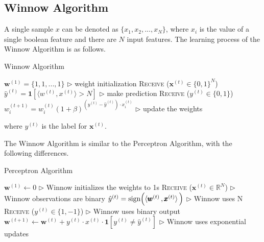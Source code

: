 \documentclass[11pt]{article}
\begin{document}
\subsection{Winnow Algorithm}
A single sample \textbf{$x$} can be denoted as $\{x_1, x_2, ..., x_N\}$, where $x_i$ is the value of a single boolean feature and there are $N$ input features. The learning process of the Winnow Algorithm is as follows.
\begin{algorithm}[H]
\caption{Winnow Algorithm}
\label{algo:winnow}
\begin{algorithmic}[1]
\STATE $\pmb{w}^{(1)} = \{1, 1, ..., 1\}$
\hfill $\triangleright$ weight initialization
\STATE \textsc{Receive} ($\pmb{x}^{(t)} \in \{0, 1\}^N$) 
\STATE $\hat{y}^{(t)} = \pmb{1}[\big\langle w^{(t)},  x^{(t)}\big\rangle > N]$ 
\hfill $\triangleright$ make prediction
\STATE \textsc{Receive} ($y^{(t)}\in\{0, 1\}$)
\STATE $w_i^{(t+1)} = w_i^{(t)}(1 + \beta)^{(y^{(t)} - \hat{y}^{(t)}) \cdot x_i^{(t)}}$
\hfill $\triangleright$ update the weights
\ENDFOR
\end{algorithmic}
\end{algorithm}

where $y^{(t)}$ is the label for $\pmb{x}^{(t)}$.

The Winnow Algorithm is similar to the Perceptron Algorithm, with the following differences.

\begin{algorithm}[H]
\caption{Perceptron Algorithm}
\label{algo:perceptron_comp}
\begin{algorithmic}[1]
\STATE $\pmb{w}^{(1)} \leftarrow 0$ \hfill $\triangleright$ Winnow initializes the weights to 1s
\STATE \textsc{Receive} ($\pmb{x}^{(t)}\in \mathbb{R}^N$) \hfill $\triangleright$ Winnow observations are binary
\STATE $\hat{y}^{(t)} = \text{sign}\Big( \langle  \pmb{w}^{(t)}  \, ,  \pmb{x}^{(t)}  \rangle\,\Big)$ \hfill $\triangleright$ Winnow uses N
\STATE \textsc{Receive} ($y^{(t)}\in\{1, -1\}$) \hfill $\triangleright$ Winnow uses binary output
\STATE $\pmb{w}^{(t+1)}\leftarrow \pmb{w}^{(t)} + y^{(t)} \cdot x^{(t)} \cdot\pmb{1}[y^{(t)}\neq \hat{y}^{(t)}] $ \hfill $\triangleright$ Winnow uses exponential updates
\ENDFOR
\end{algorithmic}
\end{algorithm}
\end{document}
